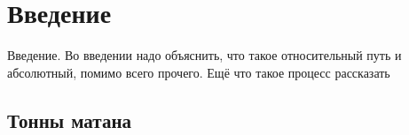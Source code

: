 \chapter{Введение}\label{base:introduction}
Введение. Во введении надо объяснить, что такое относительный путь и абсолютный, помимо всего прочего. Ещё что такое процесс рассказать
\section{Тонны матана}